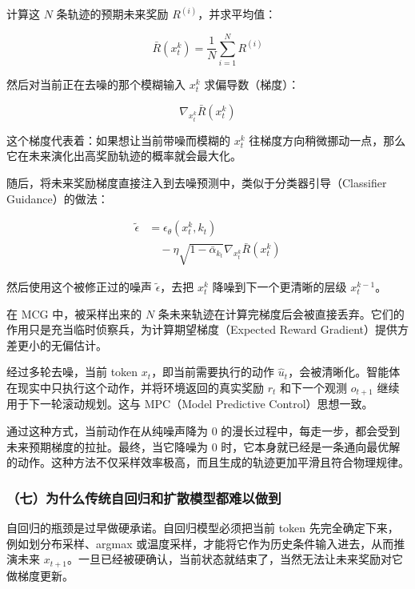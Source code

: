 计算这 \(N\) 条轨迹的预期未来奖励 \(R^{(i)}\)，并求平均值：

\[
\bar{R}(x_t^k)=\frac{1}{N}\sum_{i=1}^N R^{(i)}
\]

然后对当前正在去噪的那个模糊输入 \(x_t^k\) 求偏导数（梯度）：

\[
\nabla_{x_t^k}\bar{R}(x_t^k)
\]

这个梯度代表着：如果想让当前带噪而模糊的 \(x_t^k\) 往梯度方向稍微挪动一点，那么它在未来演化出高奖励轨迹的概率就会最大化。

随后，将未来奖励梯度直接注入到去噪预测中，类似于分类器引导（Classifier Guidance）的做法：

\[
\begin{aligned}
\tilde{\epsilon}
&=
\epsilon_\theta(x_t^k,k_t)
\\
&\quad -
\eta\sqrt{1-\bar{\alpha}_{k_t}}\nabla_{x_t^k}\bar{R}(x_t^k)
\end{aligned}
\]

然后使用这个被修正过的噪声 \(\tilde{\epsilon}\)，去把 \(x_t^k\) 降噪到下一个更清晰的层级 \(x_t^{k-1}\)。

在 MCG 中，被采样出来的 \(N\) 条未来轨迹在计算完梯度后会被直接丢弃。它们的作用只是充当临时侦察兵，为计算期望梯度（Expected Reward Gradient）提供方差更小的无偏估计。

经过多轮去噪，当前 token \(x_t\)，即当前需要执行的动作 \(\hat{u}_t\)，会被清晰化。智能体在现实中只执行这个动作，并将环境返回的真实奖励 \(r_t\) 和下一个观测 \(o_{t+1}\) 继续用于下一轮滚动规划。这与 MPC（Model Predictive Control）思想一致。

通过这种方式，当前动作在从纯噪声降为 0 的漫长过程中，每走一步，都会受到未来预期梯度的拉扯。最终，当它降噪为 0 时，它本身就已经是一条通向最优解的动作。这种方法不仅采样效率极高，而且生成的轨迹更加平滑且符合物理规律。

\hypertarget{ux4e03ux4e3aux4ec0ux4e48ux4f20ux7edfux81eaux56deux5f52ux548cux6269ux6563ux6a21ux578bux90fdux96beux4ee5ux505aux5230}{%
\subsubsection{（七）为什么传统自回归和扩散模型都难以做到}\label{ux4e03ux4e3aux4ec0ux4e48ux4f20ux7edfux81eaux56deux5f52ux548cux6269ux6563ux6a21ux578bux90fdux96beux4ee5ux505aux5230}}

自回归的瓶颈是过早做硬承诺。自回归模型必须把当前 token 先完全确定下来，例如划分布采样、argmax 或温度采样，才能将它作为历史条件输入进去，从而推演未来 \(x_{t+1}\)。一旦已经被硬确认，当前状态就结束了，当然无法让未来奖励对它做梯度更新。


